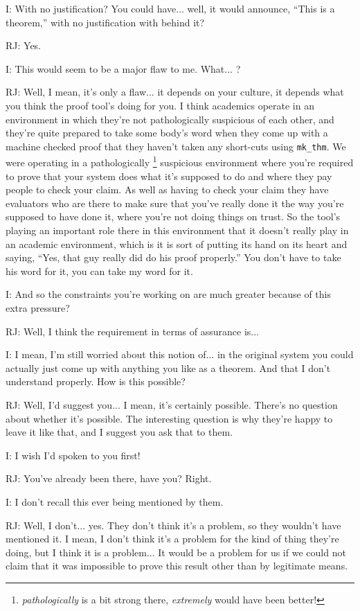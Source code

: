 \documentclass[10pt,titlepage]{book}
\begin{document}
I: With no justification?
You could have... well, it would announce, ``This is a theorem,'' with no justification with behind it?

RJ: Yes.

I: This would seem to be a major flaw to me. What... ?

RJ: Well, I mean, it's only a flaw... it depends on your culture, it depends what you think the proof tool's doing for you.
I think academics operate in an environment in which they're not pathologically suspicious of each other, and they're quite prepared to take some body's word when they come up with a machine checked proof that they haven't taken any short-cuts using {\tt mk\_thm}.
We were operating in a pathologically%
\footnote{\emph{pathologically} is a bit strong there, \emph{extremely} would have been better!}%
suspicious environment where you're required to prove that your system does what it's supposed to do and where they pay people to check your claim.
As well as having to check your claim they have evaluators who are there to make sure that you've really done it the way you're supposed to have done it, where you're not doing things on trust.
So the tool's playing an important role there in this environment that it doesn't really play in an academic environment, which is it is sort of putting its hand on its heart and saying, ``Yes, that guy really did do his proof properly.''
You don't have to take his word for it, you can take my word for it.

I: And so the constraints you're working on are much greater because of this extra pressure?

RJ: Well, I think the requirement in terms of assurance is...

I: I mean, I'm still worried about this notion of... in the original system you could actually just come up with anything you like as a theorem.
And that I don't understand properly.
How is this possible?

RJ: Well, I'd suggest you... I mean, it's certainly possible.
There's no question about whether it's possible.
The interesting question is why they're happy to leave it like that, and I suggest you ask that to them.

I: I wish I'd spoken to you first!

RJ: You've already been there, have you?
Right.

I: I don't recall this ever being mentioned by them.

RJ: Well, I don't... yes.
They don't think it's a problem, so they wouldn't have mentioned it.
I mean, I don't think it's a problem for the kind of thing they're doing, but I think it is a problem...
It would be a problem for us if we could not claim that it was impossible to prove this result other than by legitimate means.
\end{document}
